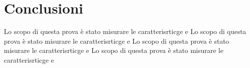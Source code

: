 \documentclass{article}
\begin{document}
\section{Conclusioni}


Lo scopo di questa prova è stato misurare le caratterisrticge e 
Lo scopo di questa prova è stato misurare le caratterisrticge e 
Lo scopo di questa prova è stato misurare le caratterisrticge e 
Lo scopo di questa prova è stato misurare le caratterisrticge e 
\end{document}
